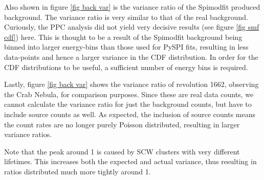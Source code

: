\documentclass{report}
\begin{document}
Also shown in figure \ref{fig back var} is the variance ratio of the Spimodfit produced background. The variance ratio is very similar to that of the real background. Curiously, the PPC analysis did not yield very decisive results (see figure \ref{fig smf cdf}) here. This is thought to be a result of the Spimodfit background being binned into larger energy-bins than those used for PySPI fits, resulting in less data-points and hence a larger variance in the CDF distribution. In order for the CDF distributions to be useful, a sufficient number of energy bins is required.

Lastly, figure \ref{fig back var} shows the variance ratio of revolution 1662, observing the Crab Nebula, for comparison purposes. Since these are real data counts, we cannot calculate the variance ratio for just the background counts, but have to include source counts as well. As expected, the inclusion of source counts means the count rates are no longer purely Poisson distributed, resulting in larger variance ratios. 

Note that the peak around 1 is caused by SCW clusters with very different lifetimes. This increases both the expected and actual variance, thus resulting in ratios distributed much more tightly around 1.
\end{document}
